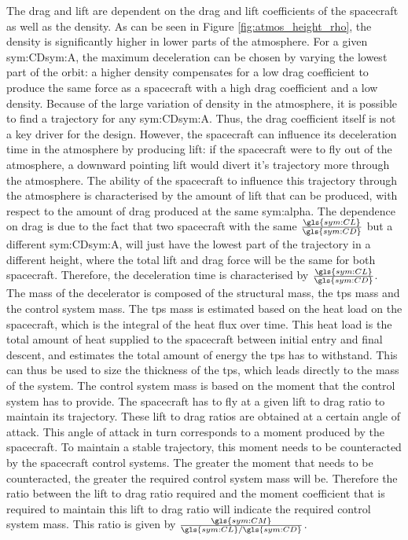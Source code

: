 The drag and lift are dependent on the drag and lift coefficients of the spacecraft as well as the density. As can be seen in Figure \ref{fig:atmos_height_rho}, the density is significantly higher in lower parts of the atmosphere. For a given \gls{sym:CD}\gls{sym:A}, the maximum deceleration can be chosen by varying the lowest part of the orbit: a higher density compensates for a low drag coefficient to produce the same force as a spacecraft with a high drag coefficient and a low density. Because of the large variation of density in the atmosphere, it is possible to find a trajectory for any \gls{sym:CD}\gls{sym:A}. Thus, the drag coefficient itself is not a key driver for the design. However, the spacecraft can influence its deceleration time in the atmosphere by producing lift: if the spacecraft were to fly out of the atmosphere, a downward pointing lift would divert it's trajectory more through the atmosphere. The ability of the spacecraft to influence this trajectory through the atmosphere is characterised by the amount of lift that can be produced, with respect to the amount of drag produced at the same \gls{sym:alpha}. The dependence on drag is due to the fact that two spacecraft with the same $\frac{\gls{sym:CL}}{\gls{sym:CD}}$ but a different \gls{sym:CD}\gls{sym:A}, will just have the lowest part of the trajectory in a different height, where the total lift and drag force will be the same for both spacecraft. Therefore, the deceleration time is characterised by $\frac{\gls{sym:CL}}{\gls{sym:CD}}$. \\

The mass of the decelerator is composed of the structural mass, the \gls{tps} mass and the control system mass. 
The \gls{tps} mass is estimated based on the heat load on the spacecraft, which is the integral of the heat flux over time. This heat load is the total amount of heat supplied to the spacecraft between initial entry and final descent, and estimates the total amount of energy the \gls{tps} has to withstand. This can thus be used to size the thickness of the \gls{tps}, which leads directly to the mass of the system.
The control system mass is based on the moment that the control system has to provide. The spacecraft has to fly at a given lift to drag ratio to maintain its trajectory. These lift to drag ratios are obtained at a certain angle of attack. This angle of attack in turn corresponds to a moment produced by the spacecraft. To maintain a stable trajectory, this moment needs to be counteracted by the spacecraft control systems. The greater the moment that needs to be counteracted, the greater the required control system mass will be. Therefore the ratio between the lift to drag ratio required and the moment coefficient that is required to maintain this lift to drag ratio will indicate the required control system mass. This ratio is given by $\frac{\gls{sym:CM}}{\gls{sym:CL}/\gls{sym:CD}}$.

